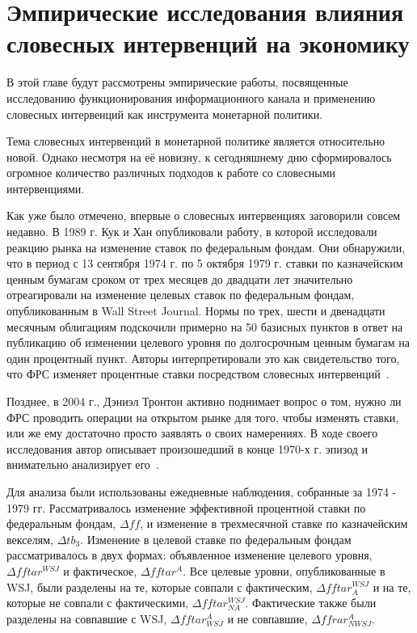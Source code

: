 \documentclass[14pt,a4paper, oneside]{extreport}
\def \Dt{\Delta}
\theoremstyle{plain}              %
\theoremstyle{definition}         %
\begin{document}
\chapter{Эмпирические исследования влияния словесных интервенций на экономику}

В этой главе будут рассмотрены эмпирические работы, посвященные исследованию функционирования информационного канала и применению словесных интервенций как инструмента монетарной политики. 

Тема словесных интервенций в монетарной политике является относительно новой. Однако несмотря на её новизну, к сегодняшнему дню сформировалось огромное количество различных подходов к работе со словесными интервенциями.

Как уже было отмечено, впервые о словесных интервенциях заговорили совсем недавно. В 1989 г. Кук и Хан опубликовали работу, в которой исследовали реакцию рынка на изменение ставок по федеральным фондам. Они обнаружили, что в период с 13 сентября 1974 г. по 5 октября 1979 г. ставки по казначейским ценным бумагам сроком от трех месяцев до двадцати лет значительно отреагировали на изменение целевых ставок по федеральным фондам, опубликованным в Wall Street Journal. Нормы по трех, шести и двенадцати месячным облигациям подскочили примерно на 50 базисных пунктов в ответ на публикацию об изменении целевого уровня по долгосрочным ценным бумагам на один процентный пункт. Авторы интерпретировали это как свидетельство того, что ФРС изменяет процентные ставки посредством словесных интервенций~\cite{cook1989effect}.

Позднее, в 2004 г., Дэниэл Тронтон активно поднимает вопрос о том, нужно ли ФРС проводить операции на открытом рынке для того, чтобы изменять ставки, или же ему достаточно просто заявлять о своих намерениях. В ходе своего исследования автор описывает произошедший в конце 1970-х г. эпизод и внимательно анализирует его~\cite{thornton2004fed}.

Для анализа были использованы ежедневные наблюдения, собранные за 1974 - 1979 гг. Рассматривалось изменение эффективной процентной ставки по федеральным фондам, $\Dt ff$, и изменение в трехмесячной ставке по казначейским векселям,  $\Dt tb_3$.   Изменение в целевой ставке по федеральным фондам рассматривалось в двух формах: объявленное изменение целевого уровня,  $\Dt fftar^{WSJ} $ и фактическое, $\Dt fftar^{A} $. Все целевые уровни, опубликованные в WSJ, были разделены на те, которые совпали с фактическим,  $\Dt fftar_A^{WSJ}$ и на те, которые не совпали с фактическими, $\Dt fftar_{NA}^{WSJ}$. Фактические также были разделены на совпавшие с WSJ, $\Dt fftar_{WSJ}^A$ и не совпавшие, $\Dt ffrar_{NWSJ}^A$.
\end{document}
